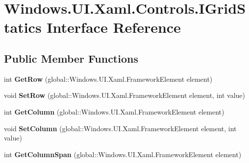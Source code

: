 \hypertarget{interface_windows_1_1_u_i_1_1_xaml_1_1_controls_1_1_i_grid_statics}{}\section{Windows.\+U\+I.\+Xaml.\+Controls.\+I\+Grid\+Statics Interface Reference}
\label{interface_windows_1_1_u_i_1_1_xaml_1_1_controls_1_1_i_grid_statics}
\subsection*{Public Member Functions}
\begin{DoxyCompactItemize}
\item 
\mbox{\label{interface_windows_1_1_u_i_1_1_xaml_1_1_controls_1_1_i_grid_statics_a7cab98248e8823c599dc35102ff746c5}} 
int {\bfseries Get\+Row} (global\+::\+Windows.\+U\+I.\+Xaml.\+Framework\+Element element)
\item 
\mbox{\label{interface_windows_1_1_u_i_1_1_xaml_1_1_controls_1_1_i_grid_statics_a74203a6ea6e2a26830dd353da361789f}} 
void {\bfseries Set\+Row} (global\+::\+Windows.\+U\+I.\+Xaml.\+Framework\+Element element, int value)
\item 
\mbox{\label{interface_windows_1_1_u_i_1_1_xaml_1_1_controls_1_1_i_grid_statics_a5669711d053518b49290b7556a8ba584}} 
int {\bfseries Get\+Column} (global\+::\+Windows.\+U\+I.\+Xaml.\+Framework\+Element element)
\item 
\mbox{\label{interface_windows_1_1_u_i_1_1_xaml_1_1_controls_1_1_i_grid_statics_a73679f372e5c95be6df634924e36dc2c}} 
void {\bfseries Set\+Column} (global\+::\+Windows.\+U\+I.\+Xaml.\+Framework\+Element element, int value)
\item 
\mbox{\label{interface_windows_1_1_u_i_1_1_xaml_1_1_controls_1_1_i_grid_statics_aeb5b4c961c8bdfd7fb2625d5ae893664}} 
int {\bfseries Get\+Column\+Span} (global\+::\+Windows.\+U\+I.\+Xaml.\+Framework\+Element element)

\end{DoxyCompactItemize}
